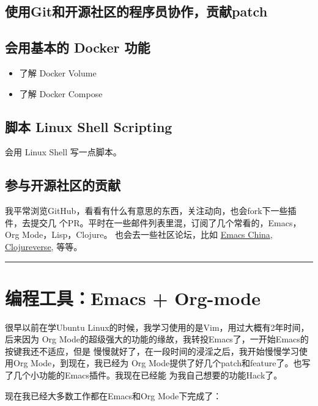 \documentclass[11pt]{article}
\begin{document}
\subsection{使用Git和开源社区的程序员协作，贡献patch}
\label{sec:orgc399d19}

\subsection{会用基本的 Docker 功能}
\label{sec:orga48f6c9}

\begin{itemize}
\item 了解 Docker Volume
\item 了解 Docker Compose
\end{itemize}

\subsection{脚本 Linux Shell Scripting}
\label{sec:org5be9123}

会用 Linux Shell 写一点脚本。

\subsection{参与开源社区的贡献}
\label{sec:org904c74c}

我平常浏览GitHub，看看有什么有意思的东西，关注动向，也会fork下一些插件，去提交几
个PR。平时在一些邮件列表里混，订阅了几个常看的，Emacs，Org Mode，Lisp，Clojure。
也会去一些社区论坛，比如 \href{https://emacs-china.org/}{Emacs China}, \href{https://clojureverse.org/}{Clojureverse}, 等等。


\noindent\rule{\textwidth}{0.8pt}

\section{编程工具：Emacs + Org-mode}
\label{sec:org12824eb}

很早以前在学Ubuntu Linux的时候，我学习使用的是Vim，用过大概有2年时间，后来因为
Org Mode的超级强大的功能的缘故，我转投Emacs了，一开始Emacs的按键我还不适应，但是
慢慢就好了，在一段时间的浸淫之后，我开始慢慢学习使用Org Mode，到现在，我已经为
Org Mode提供了好几个patch和feature了。也写了几个小功能的Emacs插件。我现在已经能
为我自己想要的功能Hack了。

现在我已经大多数工作都在Emacs和Org Mode下完成了：
\end{document}
